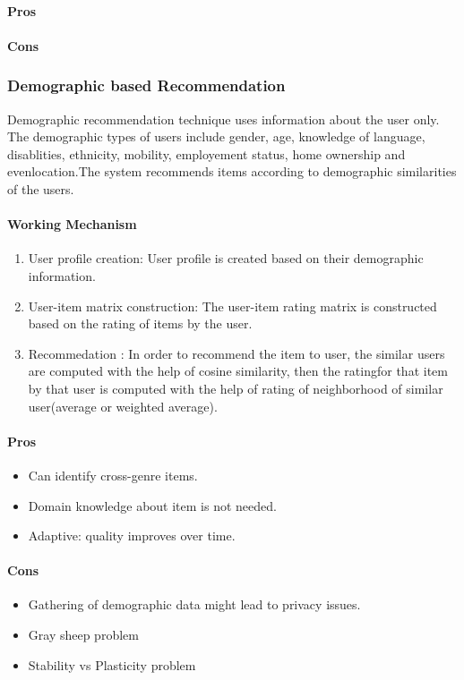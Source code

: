 \paragraph{Pros}\hfill
\paragraph{Cons}\hfill

\subsubsection{Demographic based Recommendation}
Demographic recommendation technique \cite{demographic} uses information about the user only. The demographic types of users include gender, age, knowledge of language, disablities, ethnicity, mobility, employement status, home  ownership and evenlocation.The system recommends items according to demographic similarities of the users.
\paragraph{Working Mechanism}\hfill
\begin{enumerate}
	\item User profile creation: User profile is created based on their demographic information.
	\item User-item matrix construction: The user-item rating matrix is constructed based on the rating of items by the user.
	\item Recommedation : In order to recommend the item to user, the similar users are computed with the help of cosine similarity, then the ratingfor that item by that user is computed with the help of rating of neighborhood of similar user(average or weighted average).
\end{enumerate}
\paragraph{Pros}\hfill
\begin{itemize}
	\item Can identify cross-genre items.
	\item Domain knowledge about item is not needed.
	\item Adaptive: quality improves over time.
\end{itemize}
\paragraph{Cons}\hfill
\begin{itemize}
	\item Gathering of demographic data might lead to privacy issues.
	\item Gray sheep problem
	\item Stability vs Plasticity problem
	
\end{itemize}
